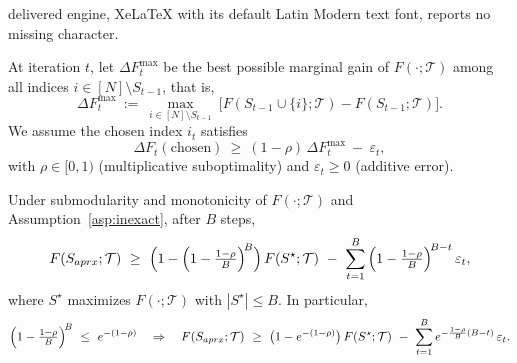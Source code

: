 \documentclass[10pt,a4paper]{amsart}
\begin{document}
delivered engine, XeLaTeX with its default Latin Modern text font, reports no missing character.
\begin{assumption}\label{asp:inexact}
At iteration $t$, let $\Delta F_t^{\max}$ be the best possible marginal gain of $F(\cdot;\mathcal T)$
among all indices $i\in [N]\setminus S_{t-1}$, that is,
\[
\Delta F_t^{\max}\ :=\ \max_{i\in [N]\setminus S_{t-1}}\ \big[F(S_{t-1}\cup\{i\};\mathcal T)-F(S_{t-1};\mathcal T)\big].
\]
We assume the chosen index $i_t$ satisfies
\[
\Delta F_t(\text{chosen})\ \ge\ (1-\rho)\,\Delta F_t^{\max}\ -\ \varepsilon_t,
\]
with $\rho\in[0,1)$ (multiplicative suboptimality) and $\varepsilon_t\ge 0$ (additive error).
\end{assumption}

\begin{theorem}\label{thm:greedy-inexact}
Under submodularity and monotonicity of $F(\cdot;\mathcal T)$ and Assumption~\ref{asp:inexact}, after $B$ steps,
\[
F(S_{\rm aprx};\mathcal T)\ \ge\ 
\Big(1-\Big(1-\tfrac{1-\rho}{B}\Big)^{\!B}\Big)\,F(S^\star;\mathcal T)\ -\ 
\sum_{t=1}^B \Big(1-\tfrac{1-\rho}{B}\Big)^{\!B-t}\,\varepsilon_t,
\]
where $S^\star$ maximizes $F(\cdot;\mathcal T)$ with $|S^\star|\le B$. In particular,
\[
\Big(1-\tfrac{1-\rho}{B}\Big)^{\!B}\ \le\ e^{-(1-\rho)}
\quad\Rightarrow\quad
F(S_{\rm aprx};\mathcal T)\ \ge\ \big(1-e^{-(1-\rho)}\big)\,F(S^\star;\mathcal T)\ -\ 
\sum_{t=1}^B e^{-\frac{1-\rho}{B}(B-t)}\,\varepsilon_t.
\]
\end{theorem}
\end{document}
